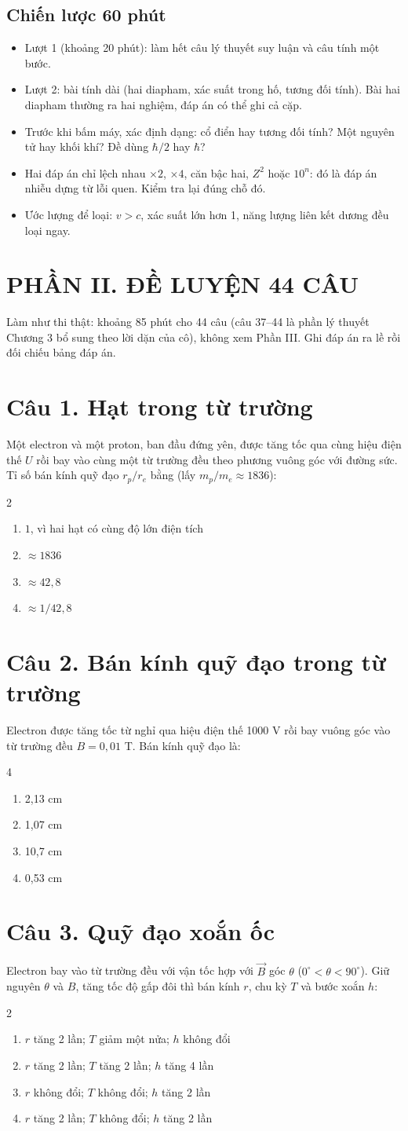 \documentclass[11pt,a4paper]{article}
\newcommand{\Cau}[2]{\par\Needspace{7\baselineskip}\section*{Câu #1. #2}}
\newcommand{\DABon}[4]{%
\begin{multicols}{4}
\begin{enumerate}[label=\Alph*., itemsep=1pt, topsep=1pt, parsep=0pt, leftmargin=1.8em]
    \item #1
    \item #2
    \item #3
    \item #4
\end{enumerate}
\end{multicols}}
\newcommand{\DAHai}[4]{%
\begin{multicols}{2}
\begin{enumerate}[label=\Alph*., itemsep=1pt, topsep=1pt, parsep=0pt, leftmargin=1.8em]
    \item #1
    \item #2
    \item #3
    \item #4
\end{enumerate}
\end{multicols}}
\newcommand{\Nhap}{\par\vspace{0.6cm}}
\begin{document}
\subsection*{Chiến lược 60 phút}
\begin{itemize}
    \item Lượt 1 (khoảng 20 phút): làm hết câu lý thuyết suy luận và câu tính một bước.
    \item Lượt 2: bài tính dài (hai diapham, xác suất trong hố, tương đối tính). Bài hai diapham thường ra hai nghiệm, đáp án có thể ghi cả cặp.
    \item Trước khi bấm máy, xác định dạng: cổ điển hay tương đối tính? Một nguyên tử hay khối khí? Đề dùng $\hbar/2$ hay $\hbar$?
    \item Hai đáp án chỉ lệch nhau $\times2$, $\times4$, căn bậc hai, $Z^2$ hoặc $10^n$: đó là đáp án nhiễu dựng từ lỗi quen. Kiểm tra lại đúng chỗ đó.
    \item Ước lượng để loại: $v>c$, xác suất lớn hơn 1, năng lượng liên kết dương đều loại ngay.
\end{itemize}

\newpage
\section*{PHẦN II. ĐỀ LUYỆN 44 CÂU}

Làm như thi thật: khoảng 85 phút cho 44 câu (câu 37--44 là phần lý thuyết Chương 3 bổ sung theo lời dặn của cô), không xem Phần III. Ghi đáp án ra lề rồi đối chiếu bảng đáp án.

\Cau{1}{Hạt trong từ trường}
Một electron và một proton, ban đầu đứng yên, được tăng tốc qua cùng hiệu điện thế $U$ rồi bay vào cùng một từ trường đều theo phương vuông góc với đường sức. Tỉ số bán kính quỹ đạo $r_p/r_e$ bằng (lấy $m_p/m_e\approx1836$):
\DAHai{$1$, vì hai hạt có cùng độ lớn điện tích}{$\approx1836$}{$\approx42{,}8$}{$\approx1/42{,}8$}
\Nhap

\Cau{2}{Bán kính quỹ đạo trong từ trường}
Electron được tăng tốc từ nghỉ qua hiệu điện thế 1000 V rồi bay vuông góc vào từ trường đều $B=0{,}01$ T. Bán kính quỹ đạo là:
\DABon{2,13 cm}{1,07 cm}{10,7 cm}{0,53 cm}
\Nhap

\Cau{3}{Quỹ đạo xoắn ốc}
Electron bay vào từ trường đều với vận tốc hợp với $\vec B$ góc $\theta$ ($0^\circ<\theta<90^\circ$). Giữ nguyên $\theta$ và $B$, tăng tốc độ gấp đôi thì bán kính $r$, chu kỳ $T$ và bước xoắn $h$:
\DAHai{$r$ tăng 2 lần; $T$ giảm một nửa; $h$ không đổi}{$r$ tăng 2 lần; $T$ tăng 2 lần; $h$ tăng 4 lần}{$r$ không đổi; $T$ không đổi; $h$ tăng 2 lần}{$r$ tăng 2 lần; $T$ không đổi; $h$ tăng 2 lần}
\Nhap
\end{document}
